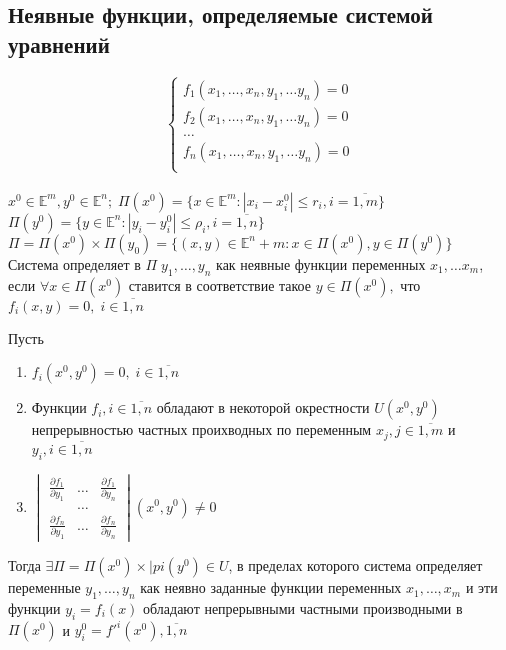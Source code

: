 \documentclass{letnab}
\begin{document}
\subsection{Неявные функции, определяемые системой уравнений}
$$
\left\{
\begin{aligned}\label{al:1}
f_1(x_1, \dots, x_n, y_1, \dots y_n )=0\\
f_2(x_1, \dots, x_n, y_1, \dots y_n )=0\\
\dots \\
f_n(x_1, \dots, x_n, y_1, \dots y_n )=0\\
\end{aligned}
\right.
$$\\
$x^0\in\mathbb{E}^m, y^0 \in \mathbb{E}^n; \; 
 \Pi(x^0)=\{x\in \mathbb{E}^m: |x_i-x_i^0|\leq r_i, i=\overline{1,m}\}$ \\
$\Pi(y^0)=\{y\in \mathbb{E}^n: |y_i-y_i^0|\leq \rho_i, i=\overline{1,n}\}$ \\
$\Pi=\Pi(x^0)\times \Pi(y_0)=\{(x,y)\in \mathbb{E}^n+m: x\in\Pi(x^0), y\in \Pi(y^0)\}$\\
Система  определяет в $\Pi\; y_1,\dots,y_n$ как неявные функции переменных $x_1, \dots x_m$, если $\forall x \in \Pi(x^0)$ ставится в соответствие такое $y\in \Pi(x^0),$ что $f_i(x,y)=0, \; i\in\overline{1,n}$ 
\begin{theorem}
	Пусть 
	\begin{enumerate}
		\item $f_i(x^0,y^0)=0, \;i\in\overline{1,n}$
		\item Функции $f_i, i\in\overline{1,n}$ обладают в некоторой окрестности $U(x^0,y^0) $ непрерывностью частных проихводных по переменным $x_j, j\in\overline{1,m}$ и $y_i, i\in\overline{1,n}$ 
		\item 
		$\begin{vmatrix}
			\frac{\partial f_1}{\partial y_1} & \dots & \frac{\partial f_1}{\partial y_n}	 \\
			 & \dots & 	 \\
			\frac{\partial f_n}{\partial y_1}& \dots & \frac{\partial f_n}{\partial y_n}
		\end{vmatrix}(x^0,y^0)\ne 0$
	\end{enumerate}
	Тогда $\exists \Pi=\Pi(x^0)\times |pi(y^0) \in U$, в пределах которого система определяет переменные $y_1,\dots,y_n$ как неявно заданные функции переменных $x_1,\dots,x_m$ и эти функции $y_i=f_i(x)$ обладают непрерывными частными производными в $\Pi(x^0)$ и $y^0_i=f'^i(x^0), \overline{1,n}$
\end{theorem}
\end{document}
